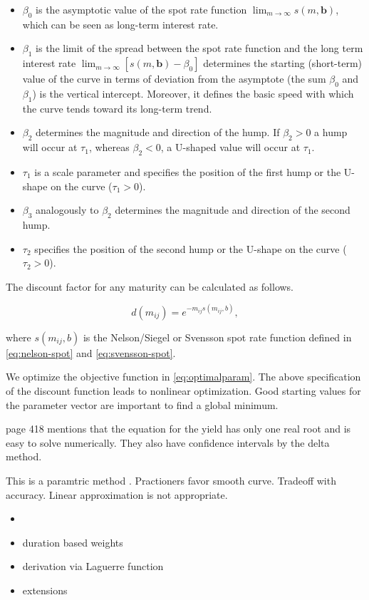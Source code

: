 \begin{itemize}
\item $\beta_0$ is the asymptotic value of the spot rate function $\lim_{m\to\infty}s(m,\bm{b})$, which can be seen as long-term interest rate.
\item $\beta_1$ is the limit of the spread between the spot rate function and the long term interest rate $\lim_{m\to\infty}\left[s(m,\bm{b})-\beta_0\right]$ determines the starting (short-term) value of the curve in terms of deviation from the asymptote (the sum $\beta_0$ and $\beta_1$) is the vertical intercept. Moreover, it defines the basic speed with which the curve tends toward its long-term trend.
\item $\beta_2$ determines the magnitude and direction of the hump. If $\beta_2 >0$  a hump will occur at  $\tau_1$, whereas $\beta_2<0$, a U-shaped value will occur at $\tau_1$.
\item $\tau_1$ is a scale parameter and specifies the position of the first hump or the U-shape on the curve ($\tau_1>0$).
\item $\beta_3$ analogously  to  $\beta_2$ determines the magnitude and direction of the second hump.
\item $\tau_2$ specifies the position of the second hump or the U-shape on the curve ($\tau_2>0$).
\end{itemize}


The discount factor for any maturity can be calculated as follows. 

\begin{displaymath}
d(m_{ij})=e^{-m_{ij}s(m_{ij},b)},
\end{displaymath}

where $s(m_{ij},b)$ is the Nelson/Siegel or Svensson spot rate function defined in \eqref{eq:nelson-spot} and \eqref{eq:svensson-spot}.

We optimize the objective function in \eqref{eq:optimalparam}. The above specification of the discount function leads to nonlinear optimization. Good starting values for the parameter vector are important to find a global minimum.



\cite{Soederlind1997} page 418 mentions that the equation for the yield has only one real root and is easy to solve numerically. They also have confidence intervals by the delta method.

This is a paramtric method \citep[see][chapter 15]{James2000}. Practioners favor smooth curve. Tradeoff with accuracy. Linear approximation is not appropriate.

\begin{itemize}
\item \cite{Geyer1999}
\item duration based weights \cite{Bliss1997}
\item derivation via Laguerre function
\item extensions \cite{Bjoerk 1999, Filipovic1999, Filipovic2000, Bjoerk2001, Bjoerk2002, Soederlind1997, Bliss1997}
\end{itemize}

